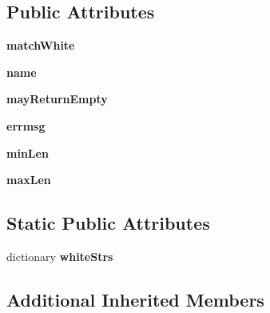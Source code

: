 \subsection*{Public Attributes}
\begin{DoxyCompactItemize}
\item 
\mbox{\label{classpkg__resources_1_1__vendor_1_1pyparsing_1_1_white_ad1c535ca7658fa4f0f5aff78167f9d75}} 
{\bfseries match\+White}
\item 
\mbox{\label{classpkg__resources_1_1__vendor_1_1pyparsing_1_1_white_a072fa84bdfd8a6b2a318b0a09246c8f3}} 
{\bfseries name}
\item 
\mbox{\label{classpkg__resources_1_1__vendor_1_1pyparsing_1_1_white_ab8d394aea9db07867c3619a2fd6c64f4}} 
{\bfseries may\+Return\+Empty}
\item 
\mbox{\label{classpkg__resources_1_1__vendor_1_1pyparsing_1_1_white_a484edfe7ddd6485da47463b483c0180c}} 
{\bfseries errmsg}
\item 
\mbox{\label{classpkg__resources_1_1__vendor_1_1pyparsing_1_1_white_ac84717e4d431a0cd7b758a3c85d91a32}} 
{\bfseries min\+Len}
\item 
\mbox{\label{classpkg__resources_1_1__vendor_1_1pyparsing_1_1_white_af831a654b09cfebb9ebf5c9f52c8ad5d}} 
{\bfseries max\+Len}
\end{DoxyCompactItemize}
\subsection*{Static Public Attributes}
\begin{DoxyCompactItemize}
\item 
dictionary {\bfseries white\+Strs}
\end{DoxyCompactItemize}
\subsection*{Additional Inherited Members}


